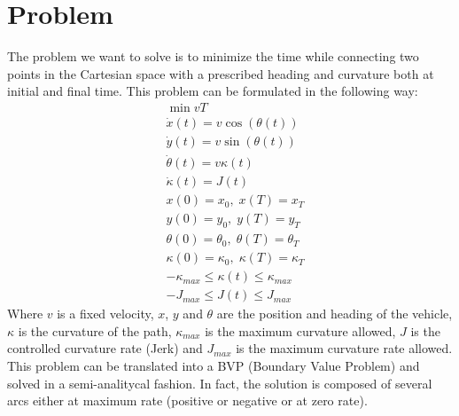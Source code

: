 \documentclass[11pt,twocolumn]{scrartcl}
\begin{document}
\section*{Problem}
%
The problem we want to solve is to minimize the time while connecting two points in the Cartesian space with a prescribed heading and curvature both at initial and final time. This problem can be formulated in the following way:
%
\begin{equation}
  \begin{split}
    &\min v T \\ 
    &\dot{x}(t)      = v \cos(\theta(t)) \\
    &\dot{y}(t)      = v \sin(\theta(t)) \\
    &\dot{\theta}(t) = v \kappa(t)       \\
    &\dot{\kappa}(t) = J(t)              \\
    &x(0)      = x_0,      \; x(T)      = x_T     \\
    &y(0)      = y_0,      \; y(T)      = y_T     \\
    &\theta(0) = \theta_0, \; \theta(T) = \theta_T\\
    &\kappa(0) = \kappa_0, \; \kappa(T) = \kappa_T\\
    &-\kappa_{max} \le \kappa(t) \le \kappa_{max} \\
    &-J_{max} \le J(t) \le J_{max}
  \end{split}
\end{equation}
%
Where $v$ is a fixed velocity, $x$, $y$ and $\theta$ are the position and heading of the vehicle, $\kappa$ is the curvature of the path, $\kappa_{max}$ is the maximum curvature allowed, $J$ is the controlled curvature rate (Jerk) and $J_{max}$ is the maximum curvature rate allowed.\\
%
This problem can be translated into a BVP (Boundary Value Problem) and solved in a semi-analitycal fashion. In fact, the solution is composed of several arcs either at maximum rate (positive or negative or at zero rate). 
%
\end{document}
